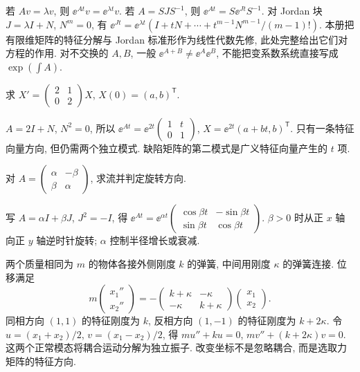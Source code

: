 若 $Av=\lambda v$, 则 $\ee^{At}v=\ee^{\lambda t}v$. 若 $A=SJS^{-1}$, 则 $\ee^{At}=S\ee^{Jt}S^{-1}$. 对 Jordan 块 $J=\lambda I+N$, $N^m=0$, 有 $\ee^{Jt}=\ee^{\lambda t}(I+tN+\cdots+t^{m-1}N^{m-1}/(m-1)!)$. 本册把有限维矩阵的特征分解与 Jordan 标准形作为线性代数先修, 此处完整给出它们对方程的作用. 对不交换的 $A,B$, 一般 $\ee^{A+B}\ne\ee^A\ee^B$, 不能把变系数系统直接写成 $\exp(\int A)$.
\begin{example}求 $X'=\begin{pmatrix}2&1\\0&2\end{pmatrix}X$, $X(0)=(a,b)^{\mathsf T}$.\end{example}
\begin{solution}
$A=2I+N$, $N^2=0$, 所以 $\ee^{At}=\ee^{2t}\begin{pmatrix}1&t\\0&1\end{pmatrix}$, $X=\ee^{2t}(a+bt,b)^{\mathsf T}$. 只有一条特征向量方向, 但仍需两个独立模式. 缺陷矩阵的第二模式是广义特征向量产生的 $t$ 项.
\end{solution}
\begin{example}对 $A=\begin{pmatrix}\alpha&-\beta\\\beta&\alpha\end{pmatrix}$, 求流并判定旋转方向.\end{example}
\begin{solution}
写 $A=\alpha I+\beta J$, $J^2=-I$, 得 $\ee^{At}=\ee^{\alpha t}\begin{pmatrix}\cos\beta t&-\sin\beta t\\\sin\beta t&\cos\beta t\end{pmatrix}$. $\beta>0$ 时从正 $x$ 轴向正 $y$ 轴逆时针旋转; $\alpha$ 控制半径增长或衰减.
\end{solution}
两个质量相同为 $m$ 的物体各接外侧刚度 $k$ 的弹簧, 中间用刚度 $\kappa$ 的弹簧连接. 位移满足
\[
m\begin{pmatrix}x_1''\\x_2''\end{pmatrix}
=-\begin{pmatrix}k+\kappa&-\kappa\\-\kappa&k+\kappa\end{pmatrix}
\begin{pmatrix}x_1\\x_2\end{pmatrix}.
\]
同相方向 $(1,1)$ 的特征刚度为 $k$, 反相方向 $(1,-1)$ 的特征刚度为 $k+2\kappa$. 令 $u=(x_1+x_2)/2$, $v=(x_1-x_2)/2$, 得 $mu''+ku=0$, $mv''+(k+2\kappa)v=0$. 这两个正常模态将耦合运动分解为独立振子. 改变坐标不是忽略耦合, 而是选取力矩阵的特征方向.
